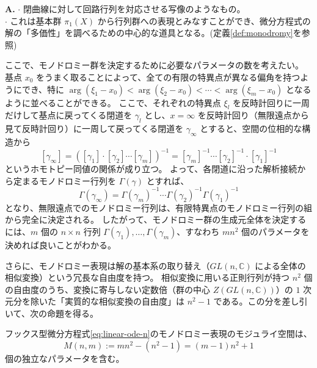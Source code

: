 \begin{Q}[モノドロミーって何？]
\textbf{A.} $\cdot$ 閉曲線に対して回路行列を対応させる写像のようなもの。\\
 $\cdot$ これは基本群 $\pi_1(X)$ から行列群への表現とみなすことができ、微分方程式の解の「多価性」を調べるための中心的な道具となる。(定義\ref{def:monodromy}を参照)\\
\end{Q}
ここで、モノドロミー群を決定するために必要なパラメータの数を考えたい。
基点 $x_{0}$ をうまく取ることによって、全ての有限の特異点が異なる偏角を持つようにでき、特に $\arg(\xi_{1}-x_{0}) < \arg(\xi_{2}-x_{0}) < \cdots < \arg(\xi_{m}-x_{0})$ となるように並べることができる。
ここで、それぞれの特異点 $\xi_{l}$ を反時計回りに一周だけして基点に戻ってくる閉道を $\gamma_{l}$ とし、$x=\infty$ を反時計回り（無限遠点から見て反時計回り）に一周して戻ってくる閉道を $\gamma_{\infty}$ とすると、空間の位相的な構造から
\[
[\gamma_{\infty}] = ([\gamma_{1}] \cdot [\gamma_{2}] \cdots [\gamma_{m}])^{-1} = [\gamma_{m}]^{-1} \cdots [\gamma_{2}]^{-1} \cdot [\gamma_{1}]^{-1}
\]
というホモトピー同値の関係が成り立つ。
よって、各閉道に沿った解析接続から定まるモノドロミー行列を $\Gamma(\gamma)$ とすれば、
\[
\Gamma(\gamma_{\infty}) = \Gamma(\gamma_{m})^{-1} \cdots \Gamma(\gamma_{2})^{-1} \Gamma(\gamma_{1})^{-1}
\]
となり、無限遠点でのモノドロミー行列は、有限特異点のモノドロミー行列の組から完全に決定される。
したがって、モノドロミー群の生成元全体を決定するには、$m$ 個の $n \times n$ 行列 $\Gamma(\gamma_{1}), \dots, \Gamma(\gamma_{m})$、すなわち $mn^{2}$ 個のパラメータを決めれば良いことがわかる。

さらに、モノドロミー表現は解の基本系の取り替え（$GL(n, \mathbb{C})$ による全体の相似変換）という冗長な自由度を持つ。
相似変換に用いる正則行列が持つ $n^{2}$ 個の自由度のうち、変換に寄与しない定数倍（群の中心 $Z(GL(n, \mathbb{C}))$）の $1$ 次元分を除いた「実質的な相似変換の自由度」は $n^{2}-1$ である。この分を差し引いて、次の命題を得る。

\begin{proposition}\label{prop:monodromy_parameters}
    フックス型微分方程式\eqref{eq:linear-ode-n}のモノドロミー表現のモジュライ空間は、
    \[
    M(n,m):=mn^{2} - (n^{2}-1) = (m-1)n^{2} + 1
    \]
    個の独立なパラメータを含む。
\end{proposition}

